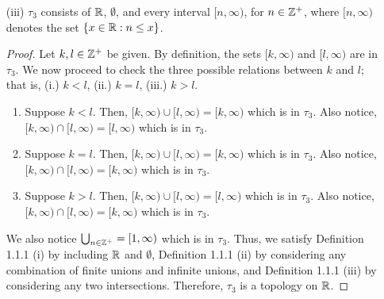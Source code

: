 \documentclass[a4paper, 12pt]{config/homework}
\begin{document}
\begin{enumerate}
\begin{enumerate}[label=(\roman*)]
\begin{proof}
Let \(k,l\in\ints^+\) be given. By definition, the sets \((-k,k)\) and \((-l,l)\) are in \(\tau_1\). We now proceed to check the three possible relations between \(k\) and \(l\); that is, (i.) \(k<l\), (ii.) \(k=l\), (iii.) \(k>l\).
\begin{enumerate}[label=(\roman*.)]
\item Suppose \(k<l\). Then, \((-k,k)\cup(-l,l)=(-l,l)\) which is in \(\tau_1\). Also notice, \((-k,k)\cap(-l,l)=(-k,k)\) which is in \(\tau_1\).
\item Suppose \(k=l\). Then, \((-k,k)\cup(-l,l)=(-k,k)\) which is in \(\tau_1\). Also notice, \((-k,k)\cap(-l,l)=(-k,k)\) which is in \(\tau_1\).
\item Suppose \(k>l\). Then, \((-k,k)\cup(-l,l)=(-k,k)\) which is in \(\tau_1\). Also notice, \((-k,k)\cap(-l,l)=(-l,l)\) which is in \(\tau_1\).
\end{enumerate}
We also notice \(\bigcup_{n\in\ints^+}(-n,n)=\reals\). Thus, we satisfy Definition 1.1.1 (i) by including \(\reals\) and \(\emptyset\), Definition 1.1.1 (ii) by considering any combination of finite unions and infinite unions, and Definition 1.1.1 (iii) by considering any two intersections. Therefore, \(\tau_1\) is a topology on \(\reals\).
\end{proof}

\pagebreak
\item[(iii)] \(\tau_3\) consists of \(\reals\), \(\emptyset\), and every interval \([n,\infty)\), for \(n\in\mathbb{Z}^+\), where \([n,\infty)\) denotes the set \(\left\{x\in\mathbb{R}:n\le x\right\}\).

\begin{proof}
Let \(k,l\in\ints^+\) be given. By definition, the sets \([k,\infty)\) and \([l,\infty)\) are in \(\tau_3\). We now proceed to check the three possible relations between \(k\) and \(l\); that is, (i.) \(k<l\), (ii.) \(k=l\), (iii.) \(k>l\).
\begin{enumerate}[label=(\roman*.)]
\item Suppose \(k<l\). Then, \([k,\infty)\cup[l,\infty)=[k,\infty)\) which is in \(\tau_3\). Also notice, \([k,\infty)\cap[l,\infty)=[l,\infty)\) which is in \(\tau_3\).
\item Suppose \(k=l\). Then, \([k,\infty)\cup[l,\infty)=[k,\infty)\) which is in \(\tau_3\). Also notice, \([k,\infty)\cap[l,\infty)=[k,\infty)\) which is in \(\tau_3\).
\item Suppose \(k>l\). Then, \([k,\infty)\cup[l,\infty)=[l,\infty)\) which is in \(\tau_3\). Also notice, \([k,\infty)\cap[l,\infty)=[k,\infty)\) which is in \(\tau_3\).
\end{enumerate}
We also notice \(\bigcup_{n\in\mathbb{Z}^+}=[1,\infty)\) which is in \(\tau_3\). Thus, we satisfy Definition 1.1.1 (i) by including \(\reals\) and \(\emptyset\), Definition 1.1.1 (ii) by considering any combination of finite unions and infinite unions, and Definition 1.1.1 (iii) by considering any two intersections. Therefore, \(\tau_3\) is a topology on \(\reals\).
\end{proof}

\end{enumerate}
\end{enumerate}
\end{document}
